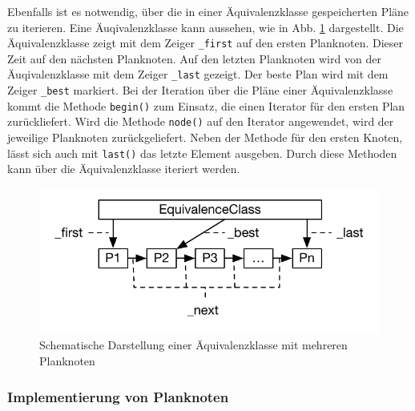 Ebenfalls ist es notwendig, über die in einer Äquivalenzklasse gespeicherten Pläne zu iterieren. Eine Äuqivalenzklasse kann aussehen,  wie in Abb. \ref{EquivalenceClassList} dargestellt. Die Äquivalenzklasse zeigt mit dem Zeiger \texttt{\_first} auf den ersten Planknoten. Dieser Zeit auf den nächsten Planknoten. Auf den letzten Planknoten wird von der Äuqivalenzklasse mit dem Zeiger \texttt{\_last} gezeigt. Der beste Plan wird mit dem Zeiger \texttt{\_best} markiert. Bei der Iteration über die Pläne einer Äquivalenzklasse kommt die Methode \texttt{begin()} zum Einsatz, die einen Iterator für den ersten Plan zurückliefert. Wird die Methode \texttt{node()} auf den Iterator angewendet, wird der jeweilige Planknoten zurückgeliefert. Neben der Methode für den ersten Knoten, lässt sich auch mit \texttt{last()} das letzte Element ausgeben. Durch diese Methoden kann über die Äquivalenzklasse iteriert werden.

\begin{figure}[ht]
  \centering
  \includegraphics{04_Implementierung/00_media/EquivalenceClassList.pdf}
  \caption{Schematische Darstellung einer Äquivalenzklasse mit mehreren Planknoten}
  \label{EquivalenceClassList}
\end{figure}


\subsubsection{Implementierung von Planknoten}


